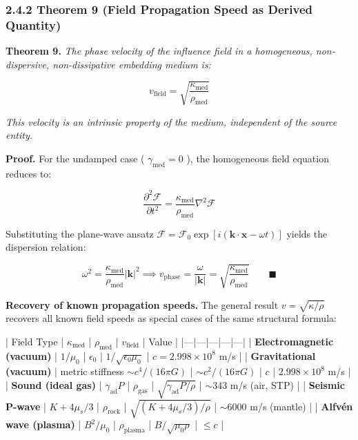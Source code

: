 \documentclass[11pt,a4paper]{article}
\theoremstyle{definition}
\theoremstyle{remark}
\begin{document}
\subsubsection{2.4.2 Theorem 9 (Field Propagation Speed as Derived Quantity)}

\textbf{Theorem 9.} \textit{The phase velocity of the influence field in a homogeneous, non-dispersive, non-dissipative embedding medium is:}


\begin{equation}
\boxed{v_{\text{field}} = \sqrt{\frac{\kappa_{\text{med}}}{\rho_{\text{med}}}}}
\end{equation}


\textit{This velocity is an intrinsic property of the medium, independent of the source entity.}

\textbf{Proof.} For the undamped case ( $\gamma_{\text{med}} = 0$ ), the homogeneous field equation reduces to:


\begin{equation}
\frac{\partial^2 \mathcal{F}}{\partial t^2} = \frac{\kappa_{\text{med}}}{\rho_{\text{med}}} \nabla^2 \mathcal{F}
\end{equation}


Substituting the plane-wave ansatz $\mathcal{F} = \mathcal{F}_0 \exp[i(\mathbf{k} \cdot \mathbf{x} - \omega t)]$ yields the dispersion relation:


\begin{equation}
\omega^2 = \frac{\kappa_{\text{med}}}{\rho_{\text{med}}} |\mathbf{k}|^2 \implies v_{\text{phase}} = \frac{\omega}{|\mathbf{k}|} = \sqrt{\frac{\kappa_{\text{med}}}{\rho_{\text{med}}}} \qquad \blacksquare
\end{equation}


\textbf{Recovery of known propagation speeds.} The general result $v = \sqrt{\kappa/\rho}$ recovers all known field speeds as special cases of the same structural formula:

| Field Type | $\kappa_{\text{med}}$ | $\rho_{\text{med}}$ | $v_{\text{field}}$ | Value |
|---|---|---|---|---|
| \textbf{Electromagnetic (vacuum)} | $1/\mu_0$ | $\epsilon_0$ | $1/\sqrt{\epsilon_0 \mu_0}$ | $c = 2.998 \times 10^8$ m/s |
| \textbf{Gravitational (vacuum)} | metric stiffness $\sim c^4/(16\pi G)$ | $\sim c^2/(16\pi G)$ | $c$ | $2.998 \times 10^8$ m/s |
| \textbf{Sound (ideal gas)} | $\gamma_{\text{ad}} P$ | $\rho_{\text{gas}}$ | $\sqrt{\gamma_{\text{ad}} P / \rho}$ | $\sim 343$ m/s (air, STP) |
| \textbf{Seismic P-wave} | $K + 4\mu_s/3$ | $\rho_{\text{rock}}$ | $\sqrt{(K + 4\mu_s/3)/\rho}$ | $\sim 6000$ m/s (mantle) |
| \textbf{Alfvén wave (plasma)} | $B^2/\mu_0$ | $\rho_{\text{plasma}}$ | $B/\sqrt{\mu_0 \rho}$ | $\leq c$ |
\end{document}
